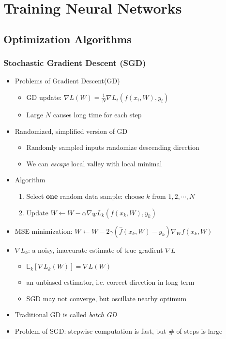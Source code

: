 \section{Training Neural Networks}

\subsection{Optimization Algorithms}

\subsubsection*{Stochastic Gradient Descent (SGD)}
\begin{itemize}
    \item Problems of Gradient Descent(GD)
    \begin{itemize}
        \item GD update: $\nabla L(W)=\frac{1}{N}\nabla L_i(f(x_i,W),y_i)$
        \item Large $N$ causes long time for each step
    \end{itemize}
    \item Randomized, simplified version of GD
    \begin{itemize}
        \item Randomly sampled inputs randomize descending direction
        \item We can \textit{escape} local valley with local minimal
    \end{itemize}
    \item Algorithm
    \begin{enumerate}
        \item Select \textbf{one} random data sample: choose $k$ from $1,2,\cdots,N$
        \item Update $W\leftarrow W-\alpha\nabla_WL_k(f(x_k,W),y_k)$
    \end{enumerate}
    \item MSE minimization: $W\leftarrow W-2\gamma\left(\hat{f}(x_k,W)-y_k\right)\nabla_Wf(x_k,W)$
    \item $\nabla L_k$: a noisy, inaccurate estimate of true gradient $\nabla L$
    \begin{itemize}
        \item $\mathbb{E}_k[\nabla L_k(W)]=\nabla L(W)$
        \item an unbiased estimator, i.e. correct direction in long-term
        \item SGD may not converge, but oscillate nearby optimum
    \end{itemize}
    \item Traditional GD is called \textit{batch GD}
    \item Problem of SGD: stepwise computation is fast, but \# of steps is large
\end{itemize}


